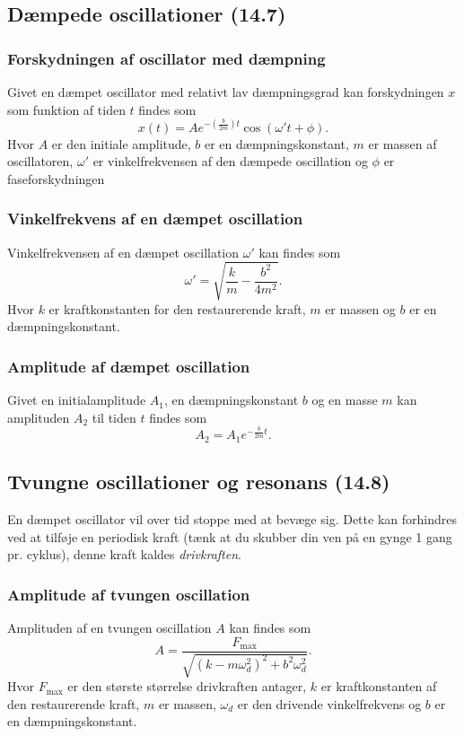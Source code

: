 \subsection{Dæmpede oscillationer (14.7)}

\subsubsection{Forskydningen af oscillator med dæmpning} \label{afs:foroscdæmp}
Givet en dæmpet oscillator med relativt lav dæmpningsgrad kan forskydningen $x$ som funktion af tiden $t$ findes som
\[ 
x(t) = Ae^{-\left( \frac{b}{2m} \right)t} \cos(\omega' t + \phi)
.\]
Hvor $A$ er den initiale amplitude, $b$ er en dæmpningskonstant, $m$ er massen af oscillatoren, $\omega'$ er vinkelfrekvensen af den dæmpede oscillation og $\phi$ er faseforskydningen


\subsubsection{Vinkelfrekvens af en dæmpet oscillation} \label{afs:vinfrekoscdæmp}
Vinkelfrekvensen af en dæmpet oscillation $\omega'$ kan findes som
\[ 
\omega' = \sqrt{\frac{k}{m}- \frac{b^2}{4m^2}}
.\]
Hvor $k$ er kraftkonstanten for den restaurerende kraft, $m$ er massen og $b$ er en dæmpningskonstant.


\subsubsection{Amplitude af dæmpet oscillation} \label{afs:ampdæmtid}
Givet en initialamplitude $A_1$, en dæmpningskonstant $b$ og en masse $m$ kan amplituden $A_2$ til tiden $t$ findes som
\[ 
A_2 = A_1 e^{-\frac{b}{2m}t}
.\]


\subsection{Tvungne oscillationer og resonans (14.8)}
En dæmpet oscillator vil over tid stoppe med at bevæge sig. Dette kan forhindres ved at tilføje en periodisk kraft (tænk at du skubber din ven på en gynge 1 gang pr. cyklus), denne kraft kaldes \textit{drivkraften}.

\subsubsection{Amplitude af tvungen oscillation} \label{afs:amptvu}
Amplituden af en tvungen oscillation $A$ kan findes som
\[ 
A = \frac{F_{\text{max}}}{\sqrt{\left( k - m\omega_d^2 \right)^2 + b^2\omega_d^2}}
.\]
Hvor $F_{\text{max}}$ er den største størrelse drivkraften antager, $k$ er kraftkonstanten af den restaurerende kraft, $m$ er massen, $\omega_d$ er den drivende vinkelfrekvens og $b$ er en dæmpningskonstant.
